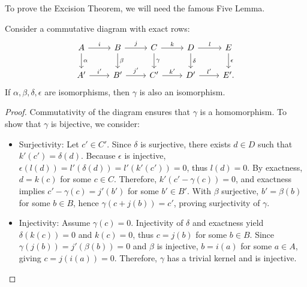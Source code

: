 To prove the Excision Theorem, we will need the famous Five Lemma.

\begin{lemma}{\cite[p.120]{hatcher2005algebraic}}
	\label{fivelemma} Consider a commutative diagram with exact rows:
	\begin{equation}
		\begin{tikzcd}
			A \arrow[r, "i"] \arrow[d, "\alpha"] & B \arrow[r, "j"] \arrow[d, "\beta"]
			& C \arrow[r, "k"] \arrow[d, "\gamma"] & D \arrow[r, "l"] \arrow[d, "\delta"]
			& E \arrow[d, "\epsilon"] \\ A' \arrow[r, "i'"] & B' \arrow[r, "j'"] & C'
			\arrow[r, "k'"] & D' \arrow[r, "l'"] & E'.
		\end{tikzcd}
	\end{equation}
	If $\alpha, \beta, \delta, \epsilon$ are isomorphisms, then $\gamma$ is also an
	isomorphism.
\end{lemma}

\begin{proof}
	Commutativity of the diagram ensures that $\gamma$ is a homomorphism. To show
	that $\gamma$ is bijective, we consider:
			
	\begin{itemize}
		\item Surjectivity: Let $c' \in C'$. Since $\delta$ is surjective, there
		      exists $d \in D$ such that $k'(c') = \delta(d)$. Because $\epsilon$ is injective,
		      $\epsilon(l(d)) = l'(\delta(d)) = l'(k'(c')) = 0$, thus $l(d) = 0$. By
		      exactness, $d = k(c)$ for some $c \in C$. Therefore, $k'(c' - \gamma(c)) =
		      0$, and exactness implies $c' - \gamma(c) = j'(b')$ for some $b' \in B'$. With
		      $\beta$ surjective, $b' = \beta(b)$ for some $b \in B$, hence $\gamma(c + j
		      (b)) = c'$, proving surjectivity of $\gamma$.
		      		      		      
		\item Injectivity: Assume $\gamma(c) = 0$. Injectivity of $\delta$ and exactness
		      yield $\delta(k(c)) = 0$ and $k(c) = 0$, thus $c = j(b)$ for some
		      $b \in B$. Since $\gamma(j(b)) = j'(\beta(b)) = 0$ and $\beta$ is injective,
		      $b = i(a)$ for some $a \in A$, giving $c = j(i(a)) = 0$. Therefore, $\gamma$
		      has a trivial kernel and is injective.
	\end{itemize}
\end{proof}

